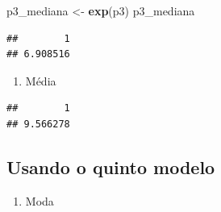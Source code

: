 \documentclass[]{article}
\newenvironment{Shaded}{\begin{snugshade}}{\end{snugshade}}
\newcommand{\KeywordTok}[1]{\textcolor[rgb]{0.13,0.29,0.53}{\textbf{#1}}}
\newcommand{\DataTypeTok}[1]{\textcolor[rgb]{0.13,0.29,0.53}{#1}}
\newcommand{\DecValTok}[1]{\textcolor[rgb]{0.00,0.00,0.81}{#1}}
\newcommand{\StringTok}[1]{\textcolor[rgb]{0.31,0.60,0.02}{#1}}
\newcommand{\OperatorTok}[1]{\textcolor[rgb]{0.81,0.36,0.00}{\textbf{#1}}}
\newcommand{\NormalTok}[1]{#1}
\providecommand{\tightlist}{%
  \setlength{\itemsep}{0pt}\setlength{\parskip}{0pt}}
\begin{document}
\begin{Shaded}
\begin{Highlighting}[]
\NormalTok{p3_mediana <-}\StringTok{ }\KeywordTok{exp}\NormalTok{(p3)}
\NormalTok{p3_mediana}
\end{Highlighting}
\end{Shaded}

\begin{verbatim}
##        1 
## 6.908516
\end{verbatim}

\begin{enumerate}
\def\labelenumi{\alph{enumi}.}
\setcounter{enumi}{2}
\tightlist
\item
  Média
\end{enumerate}

\begin{Shaded}
\end{Shaded}

\begin{verbatim}
##        1 
## 9.566278
\end{verbatim}

\subsection{Usando o quinto modelo}\label{usando-o-quinto-modelo}

\begin{enumerate}
\def\labelenumi{\alph{enumi}.}
\tightlist
\item
  Moda
\end{enumerate}

\begin{Shaded}
\end{Shaded}
\end{document}

